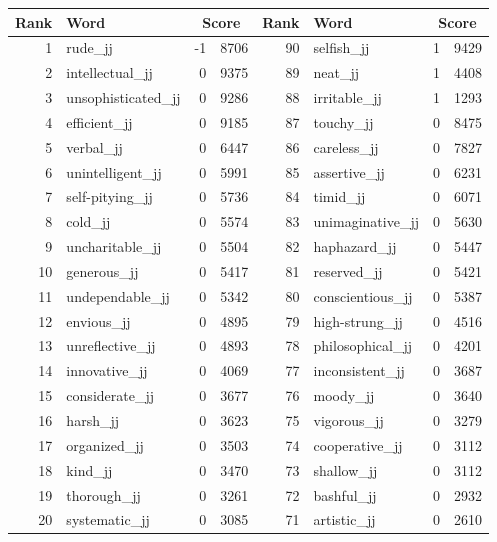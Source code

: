 \begin{table}[tbp]
    \begin{tabular}{| rlr@{.}l | rlr@{.}l |}
    \hline
    \textbf{Rank} & \textbf{Word} & \multicolumn{2}{c|}{\textbf{Score}} & \textbf{Rank} & \textbf{Word} & \multicolumn{2}{c|}{\textbf{Score}} \\
    \hline
    1 & rude\_jj & -1 & 8706    &    90 & selfish\_jj & 1 & 9429 \\
    2 & intellectual\_jj & 0 & 9375    &    89 & neat\_jj & 1 & 4408 \\
    3 & unsophisticated\_jj & 0 & 9286    &    88 & irritable\_jj & 1 & 1293 \\
    4 & efficient\_jj & 0 & 9185    &    87 & touchy\_jj & 0 & 8475 \\
    5 & verbal\_jj & 0 & 6447    &    86 & careless\_jj & 0 & 7827 \\
    6 & unintelligent\_jj & 0 & 5991    &    85 & assertive\_jj & 0 & 6231 \\
    7 & self-pitying\_jj & 0 & 5736    &    84 & timid\_jj & 0 & 6071 \\
    8 & cold\_jj & 0 & 5574    &    83 & unimaginative\_jj & 0 & 5630 \\
    9 & uncharitable\_jj & 0 & 5504    &    82 & haphazard\_jj & 0 & 5447 \\
    10 & generous\_jj & 0 & 5417    &    81 & reserved\_jj & 0 & 5421 \\
    11 & undependable\_jj & 0 & 5342    &    80 & conscientious\_jj & 0 & 5387 \\
    12 & envious\_jj & 0 & 4895    &    79 & high-strung\_jj & 0 & 4516 \\
    13 & unreflective\_jj & 0 & 4893    &    78 & philosophical\_jj & 0 & 4201 \\
    14 & innovative\_jj & 0 & 4069    &    77 & inconsistent\_jj & 0 & 3687 \\
    15 & considerate\_jj & 0 & 3677    &    76 & moody\_jj & 0 & 3640 \\
    16 & harsh\_jj & 0 & 3623    &    75 & vigorous\_jj & 0 & 3279 \\
    17 & organized\_jj & 0 & 3503    &    74 & cooperative\_jj & 0 & 3112 \\
    18 & kind\_jj & 0 & 3470    &    73 & shallow\_jj & 0 & 3112 \\
    19 & thorough\_jj & 0 & 3261    &    72 & bashful\_jj & 0 & 2932 \\
    20 & systematic\_jj & 0 & 3085    &    71 & artistic\_jj & 0 & 2610 \\

\end{tabular}
\end{table}
